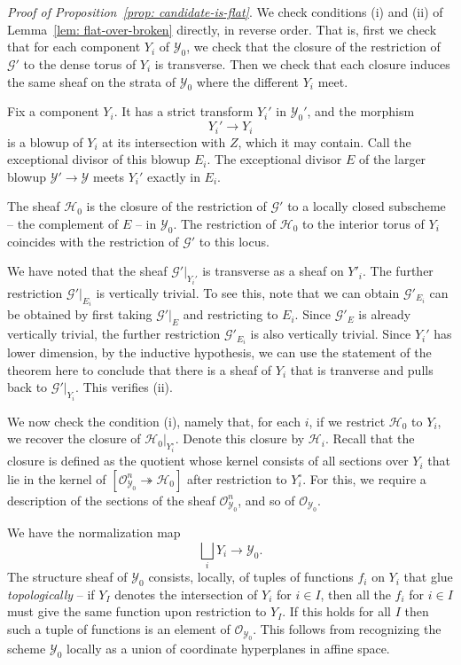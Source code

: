 \documentclass[11pt]{amsart}
\theoremstyle{definition}
\theoremstyle{definition}
\newcommand{\cY}{\mathcal{Y}}
\newcommand{\cal}{\mathcal}
\def\cY{{\cal Y}}
\begin{document}
\noindent
{\it Proof of Proposition~\ref{prop: candidate-is-flat}}. We check conditions (i) and (ii) of Lemma~\ref{lem: flat-over-broken} directly, in reverse order. That is, first we check that for each component $Y_i$ of $\mathcal Y_0$, we check that the closure of the restriction of $\mathcal G'$ to the dense torus of $Y_i$ is transverse. Then we check that each closure induces the same sheaf on the strata of $\mathcal Y_0$ where the different $Y_i$ meet. 

Fix a component $Y_i$. It has a strict transform $Y_i'$ in $\cY_0'$, and the morphism
\[
Y_i'\to Y_i
\]
is a blowup of $Y_i$ at its intersection with $Z$, which it may contain. Call the exceptional divisor of this blowup $E_i$. The exceptional divisor $E$ of the larger blowup $\cY'\to\cY$ meets $Y_i'$ exactly in $E_i$. 

The sheaf $\mathcal H_0$ is the closure of the restriction of $\mathcal G'$ to a locally closed subscheme -- the complement of $E$ -- in $\mathcal Y_0$. The restriction of $\mathcal H_0$ to the interior torus of $Y_i$ coincides with the restriction of $\mathcal G'$ to this locus. 

We have noted that the sheaf $\mathcal G'|_{Y_i'}$ is transverse as a sheaf on $Y'_i$. The further restriction $\mathcal G'|_{E_i}$ is vertically trivial. To see this, note that we can obtain $\mathcal G'_{E_i}$ can be obtained by first taking $\mathcal G'|_{E}$ and restricting to $E_i$. Since $\mathcal G'_{E}$ is already vertically trivial, the further restriction $\mathcal G'_{E_i}$ is also vertically trivial. Since $Y_i'$ has lower dimension, by the inductive hypothesis, we can use the statement of the theorem here to conclude that  there is a sheaf of $Y_i$ that is tranverse and pulls back to $\mathcal G'|_{Y_i}$. This verifies (ii). 

We now check the condition (i), namely that, for each $i$, if we restrict $\mathcal H_0$ to $Y_i$, we recover the closure of $\mathcal H_0|_{Y_i^\circ}$. Denote this closure by $\mathcal H_i$. Recall that the closure is defined as the quotient whose kernel consists of all sections over $Y_i$ that lie in the kernel  of $[\mathcal O_{\cY_0}^n\twoheadrightarrow \mathcal H_0]$ after restriction to $Y_i^\circ$. For this, we require a description of the sections of the sheaf $\mathcal O_{\cY_0}^n$, and so of $\mathcal O_{\cY_0}$. 

We have the normalization map
\[
\bigsqcup_i Y_i\to \cY_0.
\]
The structure sheaf of $\cY_0$ consists, locally, of tuples of functions $f_i$ on $Y_i$ that glue {\it topologically} -- if $Y_I$ denotes the intersection of $Y_i$ for $i\in I$, then all the $f_i$ for $i\in I$ must give the same function upon restriction to $Y_I$. If this holds for all $I$ then such a tuple of functions is an element of $\mathcal O_{\mathcal Y_0}$. This follows from recognizing the scheme $\cY_0$ locally as a union of coordinate hyperplanes in affine space. 
\end{document}
